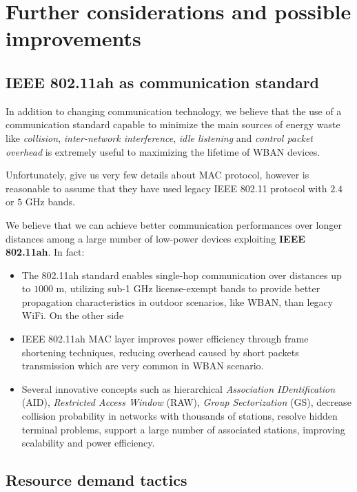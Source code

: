 \documentclass[sigchi]{acmart}
\begin{document}
\section{Further considerations and possible improvements}

\subsection{IEEE 802.11ah as communication standard}

In addition to changing communication technology, we believe that the use of a communication standard capable to minimize the main sources of energy waste like \textit{collision}, \textit{inter-network interference}, \textit{idle listening} and \textit{control packet overhead} is extremely useful to maximizing the lifetime of WBAN devices.

Unfortunately, \citet{MSAReport} give us very few details about MAC protocol, however is reasonable to assume that they have used legacy IEEE 802.11 protocol with $2.4$ or $5$ GHz bands.

We believe that we can achieve better communication performances over longer distances among a large number of low-power devices exploiting \textbf{IEEE 802.11ah}. In fact:

\begin{itemize}
\item The 802.11ah standard enables single-hop communication over distances up to $1000$ m, utilizing sub-1 GHz license-exempt bands to provide better propagation characteristics in outdoor scenarios, like WBAN, than legacy WiFi. On the other side

\item IEEE 802.11ah MAC layer improves power efficiency through frame shortening techniques, reducing overhead caused by short packets transmission which are very common in WBAN scenario.

\item Several innovative concepts such as hierarchical \textit{Association IDentification} (AID), \textit{Restricted Access Window} (RAW), \textit{Group Sectorization} (GS), decrease collision probability in networks with thousands of stations, resolve hidden terminal problems, support a large number of associated stations, improving scalability and power efficiency.

\end{itemize}

\subsection{Resource demand tactics}
\end{document}
